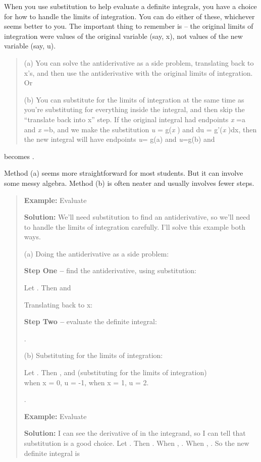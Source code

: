 When you use substitution to help evaluate a definite integrals, you
have a choice for how to handle the limits of integration. You can do
either of these, whichever seems better to you. The important thing to
remember is -- the original limits of integration were values of the
original variable (say, x), not values of the new variable (say, u).

\begin{quote}
(a) You can solve the antiderivative as a side problem, translating back
to x's, and then use the antiderivative with the original limits of
integration. Or

(b) You can substitute for the limits of integration at the same time as
you're substituting for everything inside the integral, and then skip
the ``translate back into x'' step. If the original integral had
endpoints \emph{x} =a and \emph{x} =b, and we make the substitution
\emph{u} = g(\emph{x} ) and du = g'(\emph{x} )dx, then the new integral
will have endpoints \emph{u}= g(a) and \emph{u}=g(b) and
\end{quote}

becomes .

Method (a) seems more straightforward for most students. But it can
involve some messy algebra. Method (b) is often neater and usually
involves fewer steps.

\begin{quote}
\textbf{Example:} Evaluate

\textbf{Solution:} We'll need substitution to find an antiderivative, so
we'll need to handle the limits of integration carefully. I'll solve
this example both ways.

(a) Doing the antiderivative as a side problem:

\textbf{Step One --} find the antiderivative, using substitution:

Let . Then and

Translating back to x:

\textbf{Step Two --} evaluate the definite integral:

.

(b) Substituting for the limits of integration:

Let . Then , and (substituting for the limits of integration)\\
when x = 0, u = -1, when x = 1, u = 2.

.

\textbf{Example:} Evaluate

\textbf{Solution:} I can see the derivative of in the integrand, so I
can tell that substitution is a good choice. Let . Then . When , . When
, . So the new definite integral is
\end{quote}

